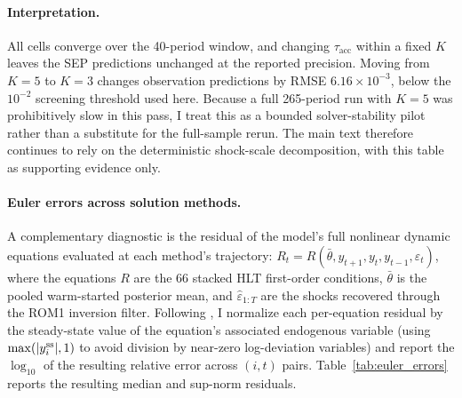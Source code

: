 \documentclass[12pt]{article}
\theoremstyle{plain}
\theoremstyle{definition}
\theoremstyle{remark}
\begin{document}
\paragraph{Interpretation.} All cells converge over the 40-period window, and changing $\tau_{\text{acc}}$ within a fixed $K$ leaves the SEP predictions unchanged at the reported precision. Moving from $K=5$ to $K=3$ changes observation predictions by RMSE $6.16\times 10^{-3}$, below the $10^{-2}$ screening threshold used here. Because a full 265-period run with $K=5$ was prohibitively slow in this pass, I treat this as a bounded solver-stability pilot rather than a substitute for the full-sample rerun. The main text therefore continues to rely on the deterministic shock-scale decomposition, with this table as supporting evidence only.

\paragraph{Euler errors across solution methods.} A complementary diagnostic is the residual of the model's full nonlinear dynamic equations evaluated at each method's trajectory: $R_t = R(\bar{\theta}, y_{t+1}, y_t, y_{t-1}, \hat{\varepsilon}_t)$, where the equations $R$ are the 66 stacked HLT first-order conditions, $\bar{\theta}$ is the pooled warm-started posterior mean, and $\hat{\varepsilon}_{1:T}$ are the shocks recovered through the ROM1 inversion filter. Following \citet{aruoba2006comparing}, I normalize each per-equation residual by the steady-state value of the equation's associated endogenous variable (using $\max(|y^{\rm ss}_i|, 1)$ to avoid division by near-zero log-deviation variables) and report the $\log_{10}$ of the resulting relative error across $(i, t)$ pairs.
Table~\ref{tab:euler_errors} reports the resulting median and sup-norm residuals.
\end{document}
